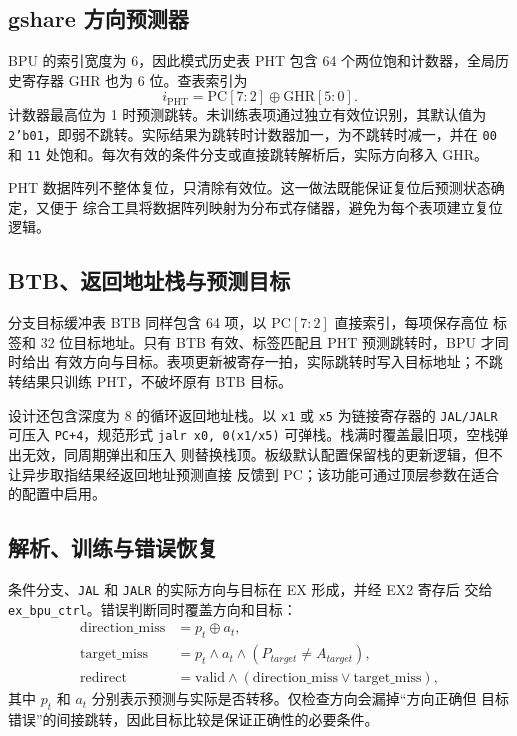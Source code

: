 \documentclass[UTF8,zihao=-4,a4paper]{ctexart}
\numberwithin{table}{section}
\numberwithin{figure}{section}
\newcommand{\code}[1]{\texttt{#1}}
\begin{document}
\subsection{gshare 方向预测器}

BPU 的索引宽度为 6，因此模式历史表 PHT 包含 64 个两位饱和计数器，全局历史寄存器
GHR 也为 6 位。查表索引为
\begin{equation}
  i_{\mathrm{PHT}}=\mathrm{PC}[7:2]\oplus\mathrm{GHR}[5:0].
  \label{eq:gshare}
\end{equation}
计数器最高位为 1 时预测跳转。未训练表项通过独立有效位识别，其默认值为
\code{2'b01}，即弱不跳转。实际结果为跳转时计数器加一，为不跳转时减一，并在
\code{00} 和 \code{11} 处饱和。每次有效的条件分支或直接跳转解析后，实际方向移入
GHR。

PHT 数据阵列不整体复位，只清除有效位。这一做法既能保证复位后预测状态确定，又便于
综合工具将数据阵列映射为分布式存储器，避免为每个表项建立复位逻辑。

\subsection{BTB、返回地址栈与预测目标}

分支目标缓冲表 BTB 同样包含 64 项，以 \(\mathrm{PC}[7:2]\) 直接索引，每项保存高位
标签和 32 位目标地址。只有 BTB 有效、标签匹配且 PHT 预测跳转时，BPU 才同时给出
有效方向与目标。表项更新被寄存一拍，实际跳转时写入目标地址；不跳转结果只训练
PHT，不破坏原有 BTB 目标。

设计还包含深度为 8 的循环返回地址栈。以 \code{x1} 或 \code{x5} 为链接寄存器的
\code{JAL/JALR} 可压入 \code{PC+4}，规范形式
\code{jalr x0, 0(x1/x5)} 可弹栈。栈满时覆盖最旧项，空栈弹出无效，同周期弹出和压入
则替换栈顶。板级默认配置保留栈的更新逻辑，但不让异步取指结果经返回地址预测直接
反馈到 PC；该功能可通过顶层参数在适合的配置中启用。

\subsection{解析、训练与错误恢复}

条件分支、\code{JAL} 和 \code{JALR} 的实际方向与目标在 EX 形成，并经 EX2 寄存后
交给 \code{ex\_bpu\_ctrl}。错误判断同时覆盖方向和目标：
\begin{align}
  \mathrm{direction\_miss} &= p_t \oplus a_t,\\
  \mathrm{target\_miss} &= p_t\land a_t\land(P_{target}\ne A_{target}),\\
  \mathrm{redirect} &= \mathrm{valid}\land
  (\mathrm{direction\_miss}\lor\mathrm{target\_miss}),
\end{align}
其中 \(p_t\) 和 \(a_t\) 分别表示预测与实际是否转移。仅检查方向会漏掉“方向正确但
目标错误”的间接跳转，因此目标比较是保证正确性的必要条件。
\end{document}
